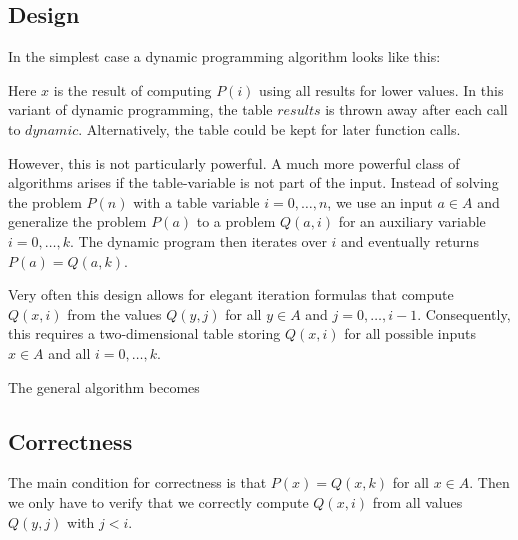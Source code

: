 \subsection{Design}

In the simplest case a dynamic programming algorithm looks like this:

\begin{acode}
\end{acode}

Here $x$ is the result of computing $P(i)$ using all results for lower values.
In this variant of dynamic programming, the table $results$ is thrown away after each call to $dynamic$.
Alternatively, the table could be kept for later function calls.

However, this is not particularly powerful.
A much more powerful class of algorithms arises if the table-variable is not part of the input.
Instead of solving the problem $P(n)$ with a table variable $i=0,\ldots,n$, we use an input $a\in A$ and generalize the problem $P(a)$ to a problem $Q(a,i)$ for an auxiliary variable $i=0,\ldots, k$.
The dynamic program then iterates over $i$ and eventually returns $P(a)=Q(a,k)$.

Very often this design allows for elegant iteration formulas that compute $Q(x,i)$ from the values $Q(y,j)$ for all $y\in A$ and $j=0,\ldots,i-1$.
Consequently, this requires a two-dimensional table storing $Q(x,i)$ for all possible inputs $x\in A$ and all $i=0,\ldots, k$.

The general algorithm becomes
\begin{acode}
\end{acode}

\subsection{Correctness}
The main condition for correctness is that $P(x)=Q(x,k)$ for all $x\in A$.
Then we only have to verify that we correctly compute $Q(x,i)$ from all values $Q(y,j)$ with $j<i$.

